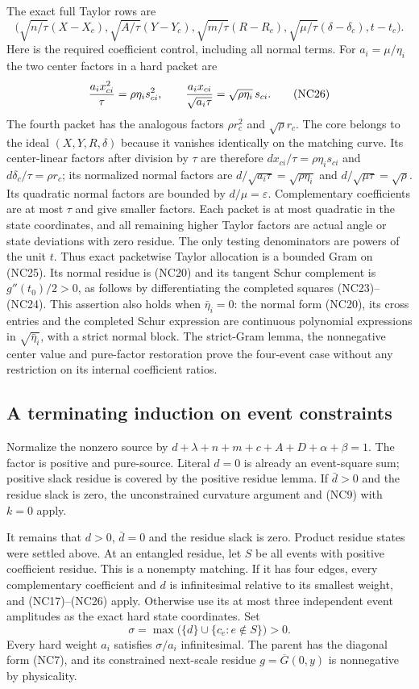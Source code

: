 The exact full Taylor rows are
\[
\big(\sqrt{n/\tau}(X-X_c),\sqrt{A/\tau}(Y-Y_c),
\sqrt{m/\tau}(R-R_c),\sqrt{\mu/\tau}(\delta-\delta_c),t-t_c\big).
 \tag{NC25}
\]
Here is the required coefficient control, including all normal terms.
For $a_i=\mu/\eta_i$ the two center factors in a hard packet are
\[
 {a_ix_{ci}^2\over\tau}=\rho\eta_i s_{ci}^2,
 \qquad {a_ix_{ci}\over\sqrt{a_i\tau}}
                    =\sqrt{\rho\eta_i}\,s_{ci}.      \tag{NC26}
\]
The fourth packet has the analogous factors $\rho r_c^2$ and
$\sqrt\rho r_c$. The core belongs to the ideal $(X,Y,R,\delta)$
because it vanishes identically on the matching curve. Its center-linear
factors after division by $\tau$ are therefore
$d x_{ci}/\tau=\rho\eta_i s_{ci}$ and
$d\delta_c/\tau=\rho r_c$; its normalized normal factors are
$d/\sqrt{a_i\tau}=\sqrt{\rho\eta_i}$ and
$d/\sqrt{\mu\tau}=\sqrt\rho$. Its quadratic normal factors are
bounded by $d/\mu=\varepsilon$. Complementary coefficients are at
most $\tau$ and give smaller factors. Each packet is at most quadratic in the
state coordinates, and all remaining higher Taylor factors are
actual angle or state deviations with zero residue. The only testing
denominators are powers of the unit $t$. Thus exact packetwise Taylor
allocation is a bounded Gram on (NC25). Its normal residue is (NC20)
and its tangent Schur complement is $g''(t_0)/2>0$, as follows by
differentiating the completed squares (NC23)--(NC24). This assertion
also holds when $\bar\eta_i=0$: the normal form (NC20), its cross
entries and the completed Schur expression are continuous polynomial
expressions in $\sqrt{\bar\eta_i}$, with a strict normal block.
The strict-Gram lemma, the nonnegative center value and pure-factor
restoration prove the four-event case without any restriction
on its internal coefficient ratios.

\subsection{A terminating induction on event constraints}

Normalize the nonzero source by $d+\lambda+n+m+c+A+D+\alpha+\beta=1$.
The factor is positive and pure-source. Literal $d=0$ is already an
event-square sum; positive slack residue is covered by the positive
residue lemma. If $\bar d>0$ and the residue slack is zero, the
unconstrained curvature argument and (NC9) with $k=0$ apply.

It remains that $d>0$, $\bar d=0$ and the residue slack is zero.
Product residue states were settled above. At an entangled residue,
let $S$ be all events with positive coefficient residue. This is a
nonempty matching. If it has four edges, every complementary
coefficient and $d$ is infinitesimal relative to its smallest weight,
and (NC17)--(NC26) apply. Otherwise use its at most three independent
event amplitudes as the exact hard state coordinates. Set
\[
 \sigma=\max\bigl(\{d\}\cup\{c_e:e\notin S\}\bigr)>0.
\]
Every hard weight $a_i$ satisfies $\sigma/a_i$ infinitesimal. The
parent has the diagonal form (NC7), and its constrained next-scale
residue $g=\overline G(0,y)$ is nonnegative by physicality.

